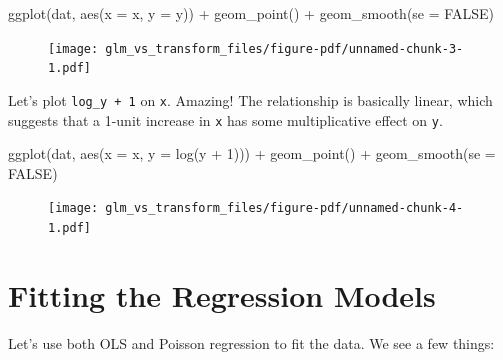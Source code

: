 \documentclass[
  letterpaper,
  DIV=11,
  numbers=noendperiod]{scrreprt}
\newenvironment{Shaded}{\begin{snugshade}}{\end{snugshade}}
\newcommand{\AttributeTok}[1]{\textcolor[rgb]{0.49,0.56,0.16}{#1}}
\newcommand{\ConstantTok}[1]{\textcolor[rgb]{0.53,0.00,0.00}{#1}}
\newcommand{\DecValTok}[1]{\textcolor[rgb]{0.25,0.63,0.44}{#1}}
\newcommand{\FunctionTok}[1]{\textcolor[rgb]{0.02,0.16,0.49}{#1}}
\newcommand{\NormalTok}[1]{\textcolor[rgb]{0.00,0.44,0.13}{#1}}
\newcommand{\SpecialCharTok}[1]{\textcolor[rgb]{0.25,0.44,0.63}{#1}}
\begin{document}
\begin{Shaded}
\begin{Highlighting}[]
\FunctionTok{ggplot}\NormalTok{(dat, }\FunctionTok{aes}\NormalTok{(}\AttributeTok{x =}\NormalTok{ x, }\AttributeTok{y =}\NormalTok{ y)) }\SpecialCharTok{+}
  \FunctionTok{geom\_point}\NormalTok{() }\SpecialCharTok{+}
  \FunctionTok{geom\_smooth}\NormalTok{(}\AttributeTok{se =} \ConstantTok{FALSE}\NormalTok{)}
\end{Highlighting}
\end{Shaded}

\begin{figure}[H]

{\centering \texttt{[image: glm\_vs\_transform\_files/figure-pdf/unnamed-chunk-3-1.pdf]}

}

\end{figure}

Let's plot \texttt{log\_y\ +\ 1} on \texttt{x}. Amazing! The
relationship is basically linear, which suggests that a 1-unit increase
in \texttt{x} has some multiplicative effect on \texttt{y}.

\begin{Shaded}
\begin{Highlighting}[]
\FunctionTok{ggplot}\NormalTok{(dat, }\FunctionTok{aes}\NormalTok{(}\AttributeTok{x =}\NormalTok{ x, }\AttributeTok{y =} \FunctionTok{log}\NormalTok{(y }\SpecialCharTok{+} \DecValTok{1}\NormalTok{))) }\SpecialCharTok{+}
  \FunctionTok{geom\_point}\NormalTok{() }\SpecialCharTok{+}
  \FunctionTok{geom\_smooth}\NormalTok{(}\AttributeTok{se =} \ConstantTok{FALSE}\NormalTok{)}
\end{Highlighting}
\end{Shaded}

\begin{figure}[H]

{\centering \texttt{[image: glm\_vs\_transform\_files/figure-pdf/unnamed-chunk-4-1.pdf]}

}

\end{figure}

\hypertarget{fitting-the-regression-models}{%
\section{Fitting the Regression
Models}\label{fitting-the-regression-models}}

Let's use both OLS and Poisson regression to fit the data. We see a few
things:
\end{document}
